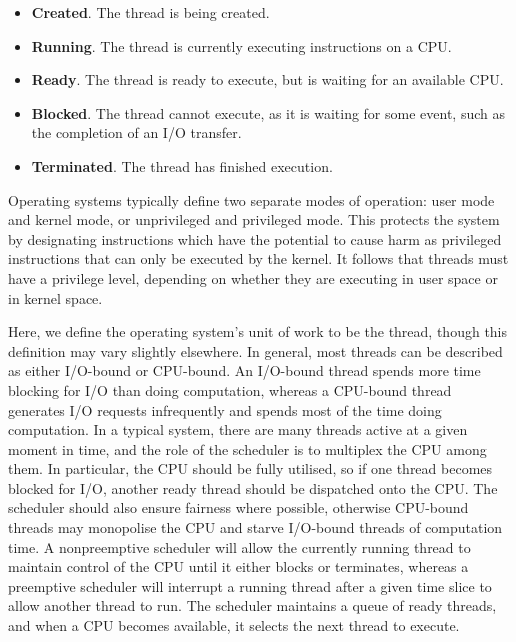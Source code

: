\documentclass[bsc,frontabs,twoside,singlespacing,parskip,deptreport]{infthesis}     %
\begin{document}
\begin{itemize}
    \item{\textbf{Created}. The thread is being created.}
    \item{\textbf{Running}. The thread is currently executing instructions on a CPU.}
    \item{\textbf{Ready}. The thread is ready to execute, but is waiting for an available CPU.}
    \item{\textbf{Blocked}. The thread cannot execute, as it is waiting for some event, such as the completion of an I/O transfer.}
    \item{\textbf{Terminated}. The thread has finished execution.}
\end{itemize}

Operating systems typically define two separate modes of operation: user mode and kernel mode, or unprivileged and privileged mode. This protects the system by designating instructions which have the potential to cause harm as privileged instructions that can only be executed by the kernel. It follows that threads must have a privilege level, depending on whether they are executing in user space or in kernel space.

Here, we define the operating system's unit of work to be the thread, though this definition may vary slightly elsewhere. In general, most threads can be described as either I/O-bound or CPU-bound. An I/O-bound thread spends more time blocking for I/O than doing computation, whereas a CPU-bound thread generates I/O requests infrequently and spends most of the time doing computation. In a typical system, there are many threads active at a given moment in time, and the role of the scheduler is to multiplex the CPU among them. In particular, the CPU should be fully utilised, so if one thread becomes blocked for I/O, another ready thread should be dispatched onto the CPU. The scheduler should also ensure fairness where possible, otherwise CPU-bound threads may monopolise the CPU and starve I/O-bound threads of computation time. A nonpreemptive scheduler will allow the currently running thread to maintain control of the CPU until it either blocks or terminates, whereas a preemptive scheduler will interrupt a running thread after a given time slice to allow another thread to run. The scheduler maintains a queue of ready threads, and when a CPU becomes available, it selects the next thread to execute.
\end{document}

